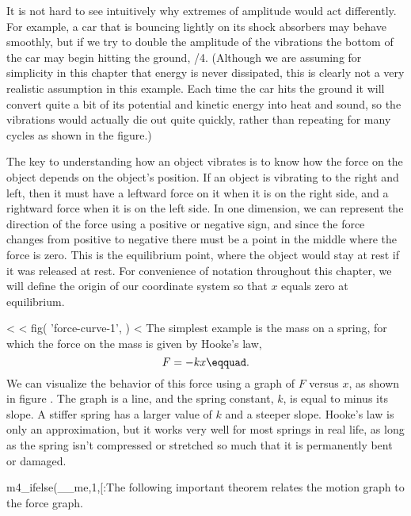 It is not hard to see intuitively why extremes of amplitude
would act differently. For example, a car that is bouncing
lightly on its shock absorbers may behave smoothly, but if
we try to double the amplitude of the vibrations the bottom
of the car may begin hitting the ground, /4. (Although we
are assuming for simplicity in this chapter that energy is
never dissipated, this is clearly not a very realistic
assumption in this example. Each time the car hits the
ground it will convert quite a bit of its potential and
kinetic energy into heat and sound, so the vibrations would
actually die out quite quickly, rather than repeating for
many cycles as shown in the figure.)

The key to understanding how an object vibrates is to know
how the force on the object depends on the object's
position. If an object is vibrating to the right and left,
then it must have a leftward force on it when it is on the
right side, and a rightward force when it is on the left
side. In one dimension, we can represent the direction of
the force using a positive or negative sign, and since the
force changes from positive to negative there must be a
point in the middle where the force is zero. This is the
equilibrium point, where the object would stay at rest if it
was released at rest. For convenience of notation throughout
this chapter, we will define the origin of our coordinate
system so that $x$ equals zero at equilibrium.

<%
<%
  fig(
    'force-curve-1',
  )
<%
The simplest example is the mass on a spring, for which the
force on the mass is given by Hooke's law,
\begin{equation*}
                F    =    -kx\eqquad.
\end{equation*}
We can visualize the behavior of this force using a graph of
$F$ versus $x$, as shown in figure . The graph is a line, and the
spring constant, $k$, is equal to minus its slope.
A stiffer
spring has a larger value of $k$ and a steeper slope.
Hooke's law is only an approximation, but it works very well
for most springs in real life, as long as the spring isn't
compressed or stretched so much that it is permanently bent or damaged.

m4_ifelse(__me,1,[:The following important theorem relates the motion graph to the force graph.

